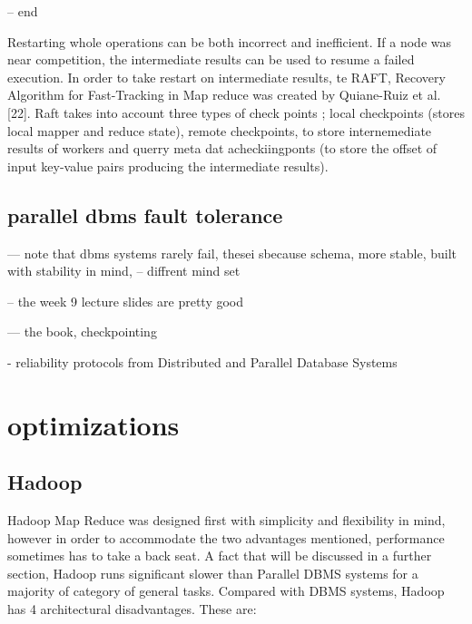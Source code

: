 \documentclass[10pt,twocolumn]{IEEEtran11}
\begin{document}
-- end



Restarting whole operations can be both incorrect and inefficient.  If a node was near competition, the intermediate results can be used to resume a failed execution.  In order to take restart on intermediate results, te RAFT, Recovery Algorithm for Fast-Tracking in Map reduce was created by Quiane-Ruiz et al. [22].  Raft takes into account three types of check points
; local checkpoints (stores local mapper and reduce state), remote checkpoints, to store internemediate results of workers and querry meta dat acheckiingponts (to store the offset of input key-value pairs producing
the intermediate results).
    






\subsection{parallel dbms fault tolerance}

--- note that dbms systems rarely fail, thesei sbecause schema, more stable, built with stability in mind,
-- diffrent mind set

-- the week 9 lecture slides are pretty good

--- the book, checkpointing

- reliability protocols from Distributed and Parallel Database Systems


\section{optimizations}
\subsection{Hadoop}


Hadoop Map Reduce was designed first with simplicity and flexibility in mind, however in order to accommodate the two advantages mentioned, performance sometimes has to take a back seat. A fact that will be discussed in a further section, Hadoop runs significant slower than Parallel DBMS systems for a majority of category of general tasks. Compared with DBMS systems, Hadoop has 4 architectural disadvantages. These are:
\end{document}
